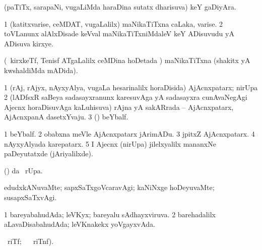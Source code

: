 {{{{{{\begin{center}
{{\bentry
{} 
\gl{\nA}
\expl{}
\bmng
(paTiTx, sarapaNi, \mo vugaLiMda haraDina sutatx dharisuva) keY gaDiyAra. 
\emng
\eentry

\bentry
{} 
\gl{\nA}
\expl{}
\bmng
\bnum
\num{1} (katitxvarise, ceMDAT, \mo vugaLalilx) maNikaTiTxna caLaka, varise. 
\num{2} toVLanunx alAlxDisade keVval maNikaTiTxniMdaleV keY ADisuvudu yA ADisuva kirxye. 
\enum
\emng
\eentry

\bentry
{} 
\gl{\gu}
\expl{}
\bmng
(\kanmu\ kirxkeTf, Tenisf ATgaLalilx ceMDina hoDetada \vi) maNikaTiTxna (shakitx yA kwshaldiMda mADida). 
\emng
\eentry

\bentry 
{} 
\gl{\nA}
\expl{}
\bmng
\bnum
\num{1} (rAj, rAjyx, nAyxyAlya, \mo vugaLa hesarinalilx horaDisida) AjAcnxpatarx; nirUpa 
\num{2} (lADfsxR saBeya sadasayxranunx karesuvAga yA sadasayxra cunAvaNegAgi Ajecnx horaDisuvAga kaLuhisuva) rAjna yA sakARrada -- AjAcnxpatarx, AjAcnxpanA dasetxYvaju. 
\num{3} (\viparx) beYbalf. 
\enum
\emng

\noindent
\gl{\pagu}
\expl{}
\bmng
\bnum
\num{1}  beYbalf. 
\num{2}  obabxna meVle AjAcnxpatarx jArimADu. 
\num{3}  jpitxZ AjAcnxpatarx. 
\num{4}  nAyxyAlyada karepatarx. 
\num{5}  I Ajecnx (nirUpa) jilelxyalilx mananxNe paDeyutatxde (jAriyalilxde). 
\enum
\emng
\eentry

\bentry 
{} 
\gl{\kirx}
\expl{}
\bmng
(\pArxparx)  \kirx da \BUkaq\ rUpa. 
\emng

\noindent 
\gl{\pagu}
\expl{}
\bmng
{}  edudxkANuvaMte; sapxSaTxgoVcaravAgi; kaNiNxge hoDeyuvaMte; susapxSaTxvAgi. 
\emng
\eentry

\bentry
{} 
\gl{\gu}
\expl{}
\bmng
\bnum
\num{1} bareyabahudAda; leVKyx; bareyalu sAdhayxviruva. 
\num{2} barehadalilx aLavaDisabahudAda; leVKnakekx yoVgayxvAda. 
\enum
\emng
\eentry

\bentry
{} 
\gl{\kirx}
\ucAcx\ riTf; \BUkaq\   \ucAcx\ riTnf). 

}}
\end{center}}}}}}}
